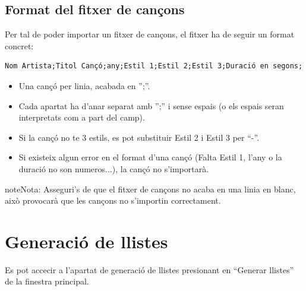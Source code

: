 \documentclass[letterpaper,10pt,oneside]{sphinxmanual}
\begin{document}
\section{Format del fitxer de cançons}
\label{gest_cancons:format-del-fitxer-de-cancons}
Per tal de poder importar un fitxer de cançons, el fitxer ha de seguir un format concret:

\begin{Verbatim}[commandchars=\\\{\}]
Nom Artista;Titol Cançó;any;Estil 1;Estil 2;Estil 3;Duració en segons;
\end{Verbatim}
\begin{itemize}
\item {} 
Una cançó per linia, acabada en '';''.

\item {} 
Cada apartat ha d'anar separat amb '';'' i sense espais (o els espais seran interpretats com a part del camp).

\item {} 
Si la cançó no te 3 estils, es pot substituir Estil 2 i Estil 3 per ``-''.

\item {} 
Si existeix algun error en el format d'una cançó (Falta Estil 1, l'any o la duració no son numeros...), la cançó no s'importarà.

\end{itemize}

\begin{notice}{note}{Nota:}
Asseguri's de que el fitxer de cançons no acaba en una linia en blanc, això provocarà que les cançons no s'importin correctament.
\end{notice}


\chapter{Generació de llistes}
\label{gen_llistes:generacio-de-llistes}\label{gen_llistes::doc}
Es pot accecir a l'apartat de generació de llistes presionant en ``Generar llistes'' de la finestra principal.
\end{document}
